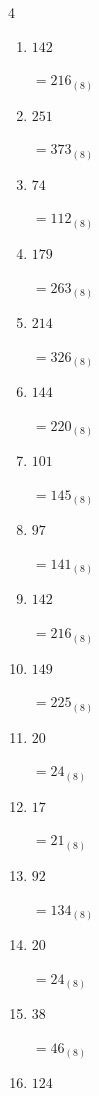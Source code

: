 \begin{multicols}{4}
\begin{enumerate}
        $=117_{(8)}$

  \item $142$

        $=216_{(8)}$

  \item $251$

        $=373_{(8)}$

  \item $74$

        $=112_{(8)}$

  \item $179$

        $=263_{(8)}$

  \item $214$

        $=326_{(8)}$

  \item $144$

        $=220_{(8)}$

  \item $101$

        $=145_{(8)}$

  \item $97$

        $=141_{(8)}$

  \item $142$

        $=216_{(8)}$

  \item $149$

        $=225_{(8)}$

  \item $20$

        $=24_{(8)}$

  \item $17$

        $=21_{(8)}$

\columnbreak %

\resetques

  \item $92$

        $=134_{(8)}$

  \item $20$

        $=24_{(8)}$

  \item $38$

        $=46_{(8)}$

  \item $124$


\end{enumerate}
\end{multicols}
